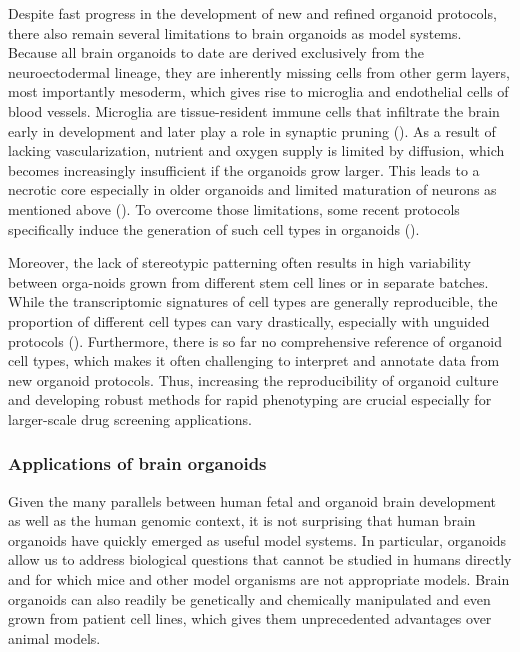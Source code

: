 Despite fast progress in the development of new and refined organoid protocols, there also remain several limitations to brain organoids as model systems. Because all brain organoids to date are derived exclusively from the neuroectodermal lineage, they are inherently missing cells from other germ layers, most importantly mesoderm, which gives rise to microglia and endothelial cells of blood vessels. Microglia are tissue-resident immune cells that infiltrate the brain early in development and later play a role in synaptic pruning (\cite{favuzzi_gaba-receptive_2021,paolicelli_synaptic_2011}). As a result of lacking vascularization, nutrient and oxygen supply is limited by diffusion, which becomes increasingly insufficient if the organoids grow larger. This leads to a necrotic core especially in older organoids and limited maturation of neurons as mentioned above (\cite{vertesy_cellular_2022,bhaduri_cell_2020}). To overcome those limitations, some recent protocols specifically induce the generation of such cell types in organoids (\cite{cakir_engineering_2019,cakir_expression_2022}).

Moreover, the lack of stereotypic patterning often results in high variability between orga-noids grown from different stem cell lines or in separate batches. While the transcriptomic signatures of cell types are generally reproducible, the proportion of different cell types can vary drastically, especially with unguided protocols (\cite{kanton_organoid_2019}). Furthermore, there is so far no comprehensive reference of organoid cell types, which makes it often challenging to interpret and annotate data from new organoid protocols. Thus, increasing the reproducibility of organoid culture and developing robust methods for rapid phenotyping are crucial especially for larger-scale drug screening applications. 



\subsubsection{Applications of brain organoids}
Given the many parallels between human fetal and organoid brain development as well as the human genomic context, it is not surprising that human brain organoids have quickly emerged as useful model systems. In particular, organoids allow us to address biological questions that cannot be studied in humans directly and for which mice and other model organisms are not appropriate models. Brain organoids can also readily be genetically and chemically manipulated and even grown from patient cell lines, which gives them unprecedented advantages over animal models. 

